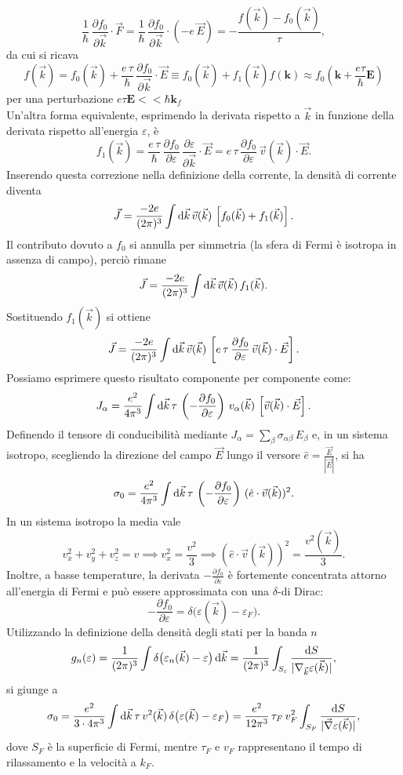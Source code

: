 \[
\frac{1}{\hbar}\,\frac{\partial f_0}{\partial \vec{k}} \cdot \vec{F} = \frac{1}{\hbar}\,\frac{\partial f_0}{\partial \vec{k}} \cdot (-e\,\vec{E}) = -\frac{f(\vec{k})-f_0(\vec{k})}{\tau},
\]
da cui si ricava
\[
f(\vec{k}) = f_0(\vec{k}) + \frac{e\,\tau}{\hbar}\,\frac{\partial f_0}{\partial \vec{k}} \cdot \vec{E} \equiv f_0(\vec{k}) + f_1(\vec{k}) f(\mathbf{k}) \approx f_0(\mathbf{k}+\frac{e\tau}{\hbar}\mathbf{E})\]
per una perturbazione $e\tau \mathbf{E}<<\hbar \mathbf{k}_f$\\
Un'altra forma equivalente, esprimendo la derivata rispetto a \(\vec{k}\) in funzione della derivata rispetto all'energia \(\varepsilon\), è
\[
f_1(\vec{k}) = \frac{e\,\tau}{\hbar}\,\frac{\partial f_0}{\partial \varepsilon}\,\frac{\partial \varepsilon}{\partial \vec{k}} \cdot \vec{E} = e\,\tau\,\frac{\partial f_0}{\partial \varepsilon}\,\vec{v}(\vec{k}) \cdot \vec{E}.
\]
Inserendo questa correzione nella definizione della corrente, la densità di corrente diventa
\[
\vec{J} = \frac{-2e}{(2\pi)^3} \int \text{d}\vec{k}\, \vec{v}(\vec{k})\, \left[f_0(\vec{k}) + f_1(\vec{k})\right].
\]
Il contributo dovuto a \(f_0\) si annulla per simmetria (la sfera di Fermi è isotropa in assenza di campo), perciò rimane
\[
\vec{J} = \frac{-2e}{(2\pi)^3} \int \text{d}\vec{k}\, \vec{v}(\vec{k})\, f_1(\vec{k}).
\]
Sostituendo \(f_1(\vec{k})\) si ottiene
\[
\vec{J} = \frac{-2e}{(2\pi)^3} \int \text{d}\vec{k}\, \vec{v}(\vec{k})\, \left[ e\,\tau\,\frac{\partial f_0}{\partial \varepsilon}\,\vec{v}(\vec{k}) \cdot \vec{E}\right].
\]
Possiamo esprimere questo risultato componente per componente come:
\[
J_\alpha = \frac{e^2}{4\pi^3} \int \text{d}\vec{k}\, \tau\, \left(-\frac{\partial f_0}{\partial \varepsilon}\right)\, v_\alpha(\vec{k})\,\left[\vec{v}(\vec{k}) \cdot \vec{E}\right].
\]
Definendo il tensore di conducibilità mediante \(J_\alpha = \sum_\beta \sigma_{\alpha\beta}\, E_\beta\) e, in un sistema isotropo, scegliendo la direzione del campo \(\vec{E}\) lungo il versore \(\hat{e} = \frac{\vec{E}}{|\vec{E}|}\), si ha
\[
\sigma_0 = \frac{e^2}{4\pi^3} \int \text{d}\vec{k}\, \tau\, \left(-\frac{\partial f_0}{\partial \varepsilon}\right) \, (\hat{e} \cdot \vec{v}(\vec{k}))^2.
\]
In un sistema isotropo la media vale
\[
v_x^2+v_y^2+v_z^2 = v \implies v_x^2 = \frac{v^2}{3} \implies (\hat{e} \cdot \vec{v}(\vec{k}))^2 = \frac{v^2(\vec{k})}{3}.
\]
Inoltre, a basse temperature, la derivata \(-\frac{\partial f_0}{\partial \varepsilon}\) è fortemente concentrata attorno all'energia di Fermi e può essere approssimata con una \(\delta\)-di Dirac:
\[
-\frac{\partial f_0}{\partial \varepsilon} = \delta\bigl(\varepsilon(\vec{k})-\varepsilon_F\bigr).
\]
Utilizzando la definizione della densità degli stati per la banda \(n\)
\[
g_n(\varepsilon) = \frac{1}{(2\pi)^3}\int \delta\bigl(\varepsilon_n(\vec{k})-\varepsilon\bigr)\, \text{d}\vec{k} = \frac{1}{(2\pi)^3} \int_{S_\varepsilon} \frac{\text{d}{S}}{|\nabla_{\vec{k}} \varepsilon(\vec{k})|},
\]
si giunge a
\[
\sigma_0 = \frac{e^2}{3\cdot 4\pi^3} \int \text{d}\vec{k}\, \tau\, v^2(\vec{k})\, \delta\bigl(\varepsilon(\vec{k})-\varepsilon_F\bigr)
= \frac{e^2}{12 \pi^3}\, \tau_F\, v_F^2 \int_{S_F} \frac{\text{d}{S}}{|\vec{\nabla} \varepsilon(\vec{k})|},
\]
dove \(S_F\) è la superficie di Fermi, mentre \(\tau_F\) e \(v_F\) rappresentano il tempo di rilassamento e la velocità a \(k_F\).\\

